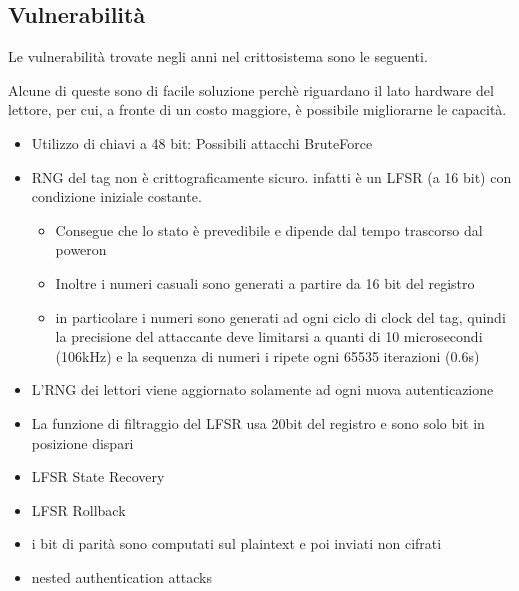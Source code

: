 \subsection{Vulnerabilità}

\begin{frame}
    Le vulnerabilità trovate negli anni nel crittosistema sono le seguenti.

    Alcune di queste sono di facile soluzione perchè riguardano il lato hardware del lettore,
    per cui, a fronte di un costo maggiore, è possibile migliorarne le capacità.
\end{frame}

\begin{frame}
    \scriptsize
    \begin{itemize}
        \item <1-> Utilizzo di chiavi a 48 bit: Possibili attacchi BruteForce \cite{courtois2008algebraic}
        \item <2-> RNG del tag non è crittograficamente sicuro. infatti è un LFSR (a 16 bit) con condizione iniziale costante.
        \begin{itemize} \scriptsize
            \item <3-> Consegue che lo stato è prevedibile e dipende dal tempo trascorso dal poweron~\cite{garcia2008dismantling}\cite{courtois2008algebraic}
            \item <4-> Inoltre i numeri casuali sono generati a partire da 16 bit del registro 
            \item <5-> in particolare i numeri sono generati ad ogni ciclo di clock del tag, quindi la precisione del attaccante deve limitarsi a quanti di 10 microsecondi (106kHz) e la sequenza di numeri i ripete ogni 65535 iterazioni (0.6s)
        \end{itemize}
        \item <6-> L'RNG dei lettori viene aggiornato solamente ad ogni nuova autenticazione~\cite{garcia2008dismantling}
        \item <7-> La funzione di filtraggio del LFSR usa 20bit del registro e sono solo bit in posizione dispari
        \item <8-> LFSR State Recovery
        \item <9-> LFSR Rollback
        \item <10-> i bit di parità sono computati sul plaintext e poi inviati non cifrati
        \item <11-> nested authentication attacks
    \end{itemize}
\end{frame}

